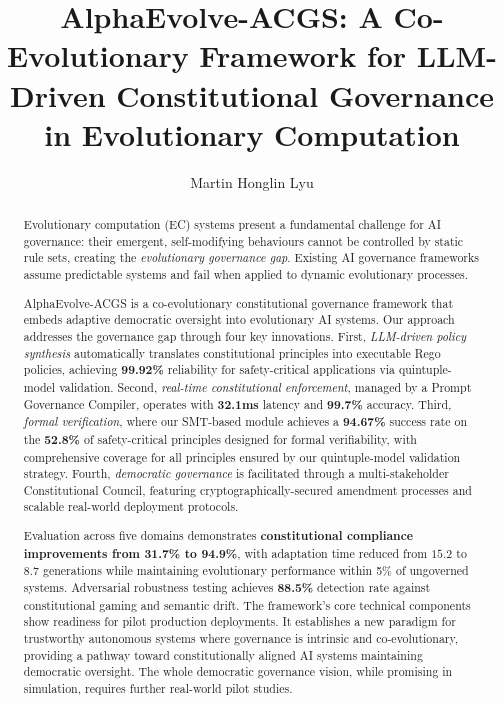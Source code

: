\documentclass[manuscript,screen,review,anonymous,9pt]{acmart}
\begin{document}
\title{AlphaEvolve-ACGS: A Co-Evolutionary Framework for LLM-Driven Constitutional Governance in Evolutionary Computation}

\author{Martin Honglin Lyu}

\begin{abstract}
	Evolutionary computation (EC) systems present a fundamental challenge for AI governance: their emergent, self-modifying behaviours cannot be controlled by static rule sets, creating the \textit{evolutionary governance gap}. Existing AI governance frameworks assume predictable systems and fail when applied to dynamic evolutionary processes.

	AlphaEvolve-ACGS is a co-evolutionary constitutional governance framework that embeds adaptive democratic oversight into evolutionary AI systems. Our approach addresses the governance gap through four key innovations. First, \textit{LLM-driven policy synthesis} automatically translates constitutional principles into executable Rego policies, achieving \textbf{99.92\%} reliability for safety-critical applications via quintuple-model validation. Second, \textit{real-time constitutional enforcement}, managed by a Prompt Governance Compiler, operates with \textbf{32.1ms} latency and \textbf{99.7\%} accuracy. Third, \textit{formal verification}, where our SMT-based module achieves a \textbf{94.67\%} success rate on the \textbf{52.8\%} of safety-critical principles designed for formal verifiability, with comprehensive coverage for all principles ensured by our quintuple-model validation strategy. Fourth, \textit{democratic governance} is facilitated through a multi-stakeholder Constitutional Council, featuring cryptographically-secured amendment processes and scalable real-world deployment protocols.

	Evaluation across five domains demonstrates \textbf{constitutional compliance improvements from 31.7\% to 94.9\%}, with adaptation time reduced from $15.2$ to $8.7$ generations while maintaining evolutionary performance within 5\% of ungoverned systems. Adversarial robustness testing achieves \textbf{88.5\%} detection rate against constitutional gaming and semantic drift. The framework's core technical components show readiness for pilot production deployments. It establishes a new paradigm for trustworthy autonomous systems where governance is intrinsic and co-evolutionary, providing a pathway toward constitutionally aligned AI systems maintaining democratic oversight. The whole democratic governance vision, while promising in simulation, requires further real-world pilot studies.
\end{abstract}
\end{document}
